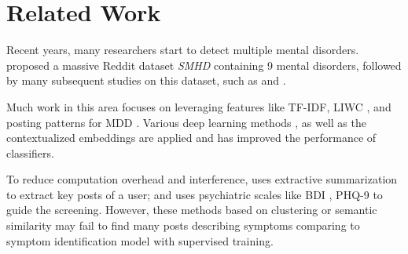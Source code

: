 \section{Related Work}


Recent years, many researchers start to detect multiple mental disorders. \citet{cohan2018smhd} proposed a massive Reddit dataset \textit{SMHD} containing 9 mental disorders, followed by many subsequent studies on this dataset, such as \citet{sekulic2019adapting} and \citet{Zhang2022SymptomIF}. 

Much work in this area focuses on leveraging features like TF-IDF,  LIWC \citep{pennebaker2001linguistic}, and posting patterns for MDD \citep{trotzek2018utilizing, losada2016test}. 
Various deep learning methods \citep{yates2017depression, gui2019cooperative}, as well as the contextualized embeddings \citep{ji2021mentalbert, jiang2020detection} are applied and has improved the performance of classifiers. 

To reduce computation overhead and interference, \citet{zogan2021depressionnet} uses extractive summarization to extract key posts of a user; \citet{zhang2022psychiatric} and \citet{lee2021micromodels} uses psychiatric scales like BDI \cite{beck1996beck}, PHQ-9 \cite{kroenke2001phq} to guide the  screening. However, these methods based on clustering or  semantic similarity may fail to find many posts describing symptoms comparing to symptom identification model \cite{Zhang2022SymptomIF} with supervised training.


